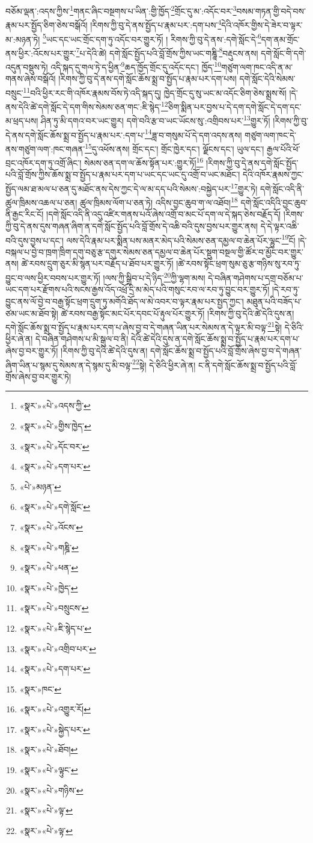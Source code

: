 བཅོམ་ལྡན་:འདས་ཀྱིས་\footnote{«སྣར་»«པེ་»འདས་ཀྱི་}གནང་ཞིང་བསྔགས་པ་ཡིན་:གྱི་ཁྱོད་\footnote{«སྣར་»«པེ་»གྱིས་ཁྱེད་}གྲོང་དུ་མ་:འདོང་བར་\footnote{«སྣར་»«པེ་»དོང་བར་}བསམ་གཏན་གྱི་བདེ་བས་རྣམ་པར་སྤྱོད་ཅིག་ཅེས་བསྒོའོ། །རིགས་ཀྱི་བུ་དེ་ནས་སྤྱོད་པ་རྣམ་པར་:དག་པས་\footnote{«སྣར་»«པེ་»དག་པར་}དེའི་འཁོར་གྱིས་དེ་ཟེར་བ་ལྟར་མ་:མཉན་ཏེ། \footnote{«པེ་»མཉན་}ཡང་དང་ཡང་གྲོང་དག་ཏུ་འདོང་བར་གྱུར་ཏོ། །
རིགས་ཀྱི་བུ་དེ་ནས་:དགེ་སློང་དེ་\footnote{«སྣར་»«པེ་»དགེ་སློང་}དག་ནམ་གྲོང་ནས་ཕྱིར་:འོངས་པར་གྱུར་\footnote{«སྣར་»«པེ་»འོངས་}པ་དེའི་ཚེ། དགེ་སློང་སྤྱོད་པའི་བློ་གྲོས་ཀྱིས་ཡང་གཎྜཱི་\footnote{«སྣར་»«པེ་»གཎྜི་}བརྡུངས་ནས། དགེ་སློང་གི་དགེ་འདུན་བསྡུས་ཏེ། འདི་སྐད་དུ་གལ་ཏེ་ད་ཕྱིན་\footnote{«སྣར་»«པེ་»ཕན་}ཆད་ཁྱོད་གྲོང་དུ་འདོང་དང་། ཁྱོད་\footnote{«སྣར་»«པེ་»ཁྱེད་}གཙུག་ལག་ཁང་འདི་ན་མ་གནས་ཞེས་བསྒོའོ། །རིགས་ཀྱི་བུ་དེ་ནས་དགེ་སློང་ཆོས་སྨྲ་བ་སྤྱོད་པ་རྣམ་པར་དག་པས། དགེ་སློང་དེའི་སེམས་བསྲུང་\footnote{«སྣར་»«པེ་»བསྲུངས་}བའི་ཕྱིར་རང་གི་འཁོར་རྣམས་བོས་ཏེ་འདི་སྐད་དུ། ཁྱེད་གྲོང་དུ་སུ་ཡང་མ་འདོང་ཅིག་ཅེས་སྨྲས་སོ། །དེ་ནས་དེའི་ཚེ་དགེ་སློང་དེ་དག་གིས་སེམས་ཅན་གང་:ཇི་སྙེད་\footnote{«སྣར་»«པེ་»ཇི་སྙེད་པ་}ཅིག་སྨིན་པར་བྱས་པ་དེ་དག་དགེ་སློང་དེ་དག་དང་མ་ཕྲད་པས། ཤིན་ཏུ་མི་དགའ་བར་ཡང་གྱུར། དགེ་བའི་རྩ་བ་ཡང་ཡོངས་སུ་:འགྲིབས་པར་\footnote{«སྣར་»«པེ་»འགྲིབ་པར་}གྱུར་ཏོ། །རིགས་ཀྱི་བུ་དེ་ནས་དགེ་སློང་ཆོས་སྨྲ་བ་སྤྱོད་པ་རྣམ་པར་:དག་པ་\footnote{«སྣར་»«པེ་»དག་པར་}ཟླ་བ་གསུམ་པོ་དེ་དག་འདས་ནས། གཙུག་ལག་ཁང་དེ་ནས་གཙུག་ལག་:ཁང་གཞན་\footnote{«སྣར་»ཁང་}དུ་འཕོས་ནས། གྲོང་དང་། གྲོང་ཁྱེར་དང་། ལྗོངས་དང་། ཡུལ་དང་། རྒྱལ་པོའི་ཕོ་བྲང་འཁོར་དག་ཏུ་འགྲོ་ཞིང་། སེམས་ཅན་དག་ལ་ཆོས་སྟོན་པར་:གྱུར་ཏོ།\footnote{«སྣར་»«པེ་»འགྱུར་རོ།} །རིགས་ཀྱི་བུ་དེ་ནས་དགེ་སློང་སྤྱོད་པའི་བློ་གྲོས་ཀྱིས་ཆོས་སྨྲ་བ་སྤྱོད་པ་རྣམ་པར་དག་པ་ཡང་དང་ཡང་དུ་འགྲོ་བ་ཡང་མཐོང་། དེའི་འཁོར་རྣམས་ཀྱང་སྤྱོད་ལམ་ཐ་མལ་པ་ཅན་དུ་མཐོང་ནས་དེས་ཀྱང་དེ་ལ་མ་དད་པའི་སེམས་:བསྐྱེད་པར་\footnote{«སྣར་»«པེ་»སྐྱེད་པར་}གྱུར་ཏེ། དགེ་སློང་འདི་ནི་ཚུལ་ཁྲིམས་འཆལ་པ་ཅན། ཚུལ་ཁྲིམས་ལོག་པ་ཅན་ཏེ། འདིས་བྱང་ཆུབ་ག་ལ་འཐོབ།\footnote{«སྣར་»«པེ་»ཐོབ།} དགེ་སློང་འདིའི་བྱང་ཆུབ་ནི་རྒྱང་རིང་ངོ། །དགེ་སློང་འདི་ནི་འདུ་འཛིར་གནས་པའོ་ཞེས་འགྲོ་བ་མང་པོ་དག་ལ་དེ་སྐད་ཅེས་བརྗོད་དོ། །རིགས་ཀྱི་བུ་དེ་ནས་དུས་གཞན་ཞིག་ན་དགེ་སློང་སྤྱོད་པའི་བློ་གྲོས་དེ་འཆི་བའི་དུས་བྱས་པར་གྱུར་ནས། དེ་དེ་ལྟར་འཆི་བའི་དུས་བྱས་པ་དང་། ལས་དེའི་རྣམ་པར་སྨིན་པས་མནར་མེད་པའི་སེམས་ཅན་དམྱལ་བ་ཆེན་པོར་ལྷུང་\footnote{«སྣར་»«པེ་»ལྟུང་}ངོ། །དེ་བསྐལ་པ་བྱེ་བ་ཁྲག་ཁྲིག་དགུ་བཅུ་རྩ་དགུར་སེམས་ཅན་དམྱལ་བ་ཆེན་པོར་སྡུག་བསྔལ་གྱི་ཚོར་བ་མྱོང་བར་གྱུར་ནས། ཚེ་རབས་དྲུག་ཅུར་མི་སྙན་པར་བརྗོད་པ་ཐོབ་པར་གྱུར་ཏོ། །ཚེ་རབས་སྟོང་ཕྲག་སུམ་ཅུ་རྩ་གཉིས་སུ་རབ་ཏུ་བྱུང་བ་ལས་ཕྱིར་བབས་པར་གྱུར་ཏོ། །ལས་ཀྱི་སྒྲིབ་པ་དེ་ཉིད་\footnote{«སྣར་»«པེ་»གཉིས་}ཀྱི་ལྷག་མས། དེ་བཞིན་གཤེགས་པ་དགྲ་བཅོམ་པ་ཡང་དག་པར་རྫོགས་པའི་སངས་རྒྱས་འོད་འཕྲོ་དྲི་མ་མེད་པའི་གསུང་རབ་ལ་རབ་ཏུ་བྱུང་བར་གྱུར་ཏོ། །དེ་རབ་ཏུ་བྱུང་ནས་ལོ་བྱེ་བ་བརྒྱ་སྟོང་ཕྲག་དྲུག་ཏུ་མགོའི་ཐོད་ལ་མེ་འབར་བ་ལྟར་རྣམ་པར་སྤྱད་ཀྱང་། མཐུན་པའི་བཟོད་པ་ཙམ་ཡང་མ་ཐོབ་སྟེ། ཚེ་རབས་བརྒྱ་སྟོང་མང་པོར་དབང་པོ་རྟུལ་པོར་གྱུར་ཏོ། །རིགས་ཀྱི་བུ་དེའི་ཚེ་དེའི་དུས་ན། དགེ་སློང་ཆོས་སྨྲ་བ་སྤྱོད་པ་རྣམ་པར་དག་པ་ཞེས་བྱ་བ་དེ་གཞན་ཡིན་པར་སེམས་ན་དེ་ལྟར་མི་བལྟ་\footnote{«སྣར་»«པེ་»ལྟ་}སྟེ། དེ་ཅིའི་ཕྱིར་ཞེ་ན། དེ་བཞིན་གཤེགས་པ་མི་སྒུལ་བ་ནི། དེའི་ཚེ་དེའི་དུས་ན་དགེ་སློང་ཆོས་སྨྲ་བ་སྤྱོད་པ་རྣམ་པར་དག་པ་ཞེས་བྱ་བར་གྱུར་ཏོ། །རིགས་ཀྱི་བུ་དེའི་ཚེ་དེའི་དུས་ན། དགེ་སློང་ཆོས་སྨྲ་བ་སྤྱོད་པའི་བློ་གྲོས་ཞེས་བྱ་བ་དེ་གཞན་ཞིག་ཡིན་པ་སྙམ་དུ་སེམས་ན་དེ་སྙམ་དུ་མི་བལྟ་\footnote{«སྣར་»«པེ་»ལྟ་}སྟེ། དེ་ཅིའི་ཕྱིར་ཞེ་ན། ང་ནི་དགེ་སློང་ཆོས་སྨྲ་བ་སྤྱོད་པའི་བློ་གྲོས་ཞེས་བྱ་བར་གྱུར་ཏེ། 